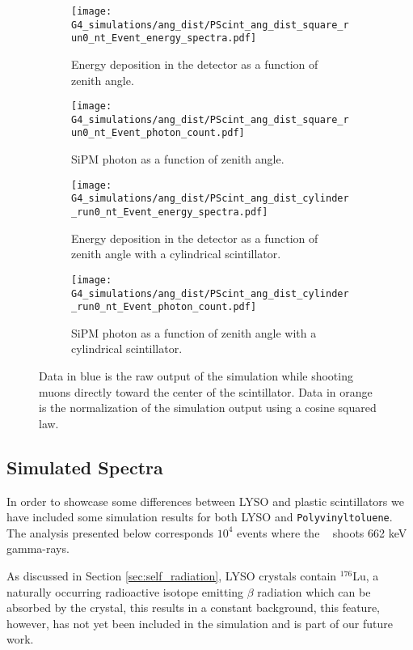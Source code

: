 \begin{figure}[H]
  \centering
  \begin{subfigure}[t]{0.49\textwidth}
    \texttt{[image: G4\_simulations/ang\_dist/PScint\_ang\_dist\_square\_run0\_nt\_Event\_energy\_spectra.pdf]}
    \caption{\label{sfig:ang_edep}Energy deposition in the detector as a function of zenith angle.}
  \end{subfigure}
  \hfill
  \begin{subfigure}[t]{0.49\textwidth}
    \texttt{[image: G4\_simulations/ang\_dist/PScint\_ang\_dist\_square\_run0\_nt\_Event\_photon\_count.pdf]}
    \caption{\label{sfig:ang_pcount}SiPM photon as a function of zenith angle.}
  \end{subfigure}
  \medskip
  \begin{subfigure}[t]{0.49\textwidth}
    \texttt{[image: G4\_simulations/ang\_dist/PScint\_ang\_dist\_cylinder\_run0\_nt\_Event\_energy\_spectra.pdf]}
    \caption{\label{sfig:ang_edep_cylinder}Energy deposition in the detector as a function of zenith angle with a cylindrical scintillator.}
  \end{subfigure}
  \hfill
  \begin{subfigure}[t]{0.49\textwidth}
    \texttt{[image: G4\_simulations/ang\_dist/PScint\_ang\_dist\_cylinder\_run0\_nt\_Event\_photon\_count.pdf]}
    \caption{\label{sfig:ang_pcount_cylinder}SiPM photon as a function of zenith angle with a cylindrical scintillator.}
  \end{subfigure}
  \caption{\label{fig:ang_results}Data in blue is the raw output of the simulation while shooting muons directly toward the center of the scintillator. Data in orange is the normalization of the simulation output using a cosine squared law.}
\end{figure}

\subsection{Simulated Spectra}\label{sec:simulated_spectra}

In order to showcase some differences between LYSO and plastic scintillators we have included some simulation results for both LYSO and \texttt{Polyvinyltoluene}. The analysis presented below corresponds $10^4$ events where the \gps~ shoots 662 \unit{\kilo\eV} gamma-rays.

As discussed in Section \ref{sec:self_radiation}, LYSO crystals contain $^{176}$Lu, a naturally occurring radioactive isotope emitting $\beta$ radiation which can be absorbed by the crystal, this results in a constant background, this feature, however, has not yet been included in the simulation and is part of our future work.

